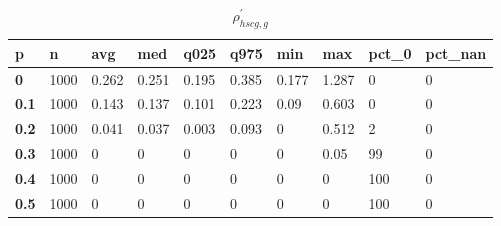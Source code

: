 \begin{table}[h]
 \centering 
\footnotesize
\caption{$\rho_{hscg,g}^\prime $}
\label{tab:alphahscgg}
\begin{tabular}[h]{|l|l|l|l|l|l|l|l|l|l|
    } \hline
\textbf{ p} & \textbf{ n} & \textbf{ avg} & \textbf{ med} & \textbf{ q025} & \textbf{ q975} & \textbf{ min} & \textbf{ max} & \textbf{ pct\_0} & \textbf{ pct\_nan}
    \\ \hline
  \textbf{  0} & 1000 & 0.262 & 0.251 & 0.195 & 0.385 & 0.177 & 1.287 &   0 & 0
    \\ \hline
  \textbf{0.1} & 1000 & 0.143 & 0.137 & 0.101 & 0.223 &  0.09 & 0.603 &   0 & 0
    \\ \hline
  \textbf{0.2} & 1000 & 0.041 & 0.037 & 0.003 & 0.093 &     0 & 0.512 &   2 & 0
    \\ \hline
  \textbf{0.3} & 1000 &     0 &     0 &     0 &     0 &     0 &  0.05 &  99 & 0
    \\ \hline
  \textbf{0.4} & 1000 &     0 &     0 &     0 &     0 &     0 &     0 & 100 & 0
    \\ \hline
  \textbf{0.5} & 1000 &     0 &     0 &     0 &     0 &     0 &     0 & 100 & 0
    \\ \hline
 \end{tabular}
 \end{table}
